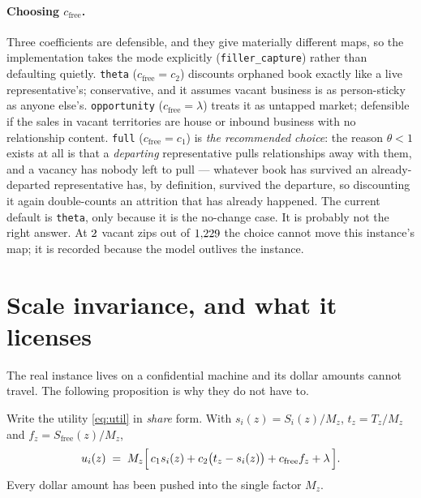 \documentclass[11pt]{article}
\theoremstyle{definition}
\newcommand{\Sfree}{S_{\mathrm{free}}}
\newcommand{\cfree}{c_{\mathrm{free}}}
\begin{document}
\paragraph{Choosing $\cfree$.}
Three coefficients are defensible, and they give materially different maps, so the
implementation takes the mode explicitly (\texttt{filler\_capture}) rather than defaulting
quietly. \texttt{theta} ($\cfree=c_2$) discounts orphaned book exactly like a live
representative's; conservative, and it assumes vacant business is as person-sticky as
anyone else's. \texttt{opportunity} ($\cfree=\lambda$) treats it as untapped market;
defensible if the sales in vacant territories are house or inbound business with no
relationship content. \texttt{full} ($\cfree=c_1$) is \emph{the recommended choice}: the
reason $\theta<1$ exists at all is that a \emph{departing} representative pulls
relationships away with them, and a vacancy has nobody left to pull --- whatever book has
survived an already-departed representative has, by definition, survived the departure, so
discounting it again double-counts an attrition that has already happened. The current
default is \texttt{theta}, only because it is the no-change case. It is probably not the
right answer. At $2$ vacant zips out of $1{,}229$ the choice cannot move this
instance's map; it is recorded because the model outlives the instance.

\section{Scale invariance, and what it licenses}\label{sec:scale}

The real instance lives on a confidential machine and its dollar amounts cannot travel.
The following proposition is why they do not have to.

Write the utility \eqref{eq:util} in \emph{share} form. With
$s_i(z)=S_i(z)/M_z$, $t_z=T_z/M_z$ and $f_z=\Sfree(z)/M_z$,
\begin{equation}\label{eq:shares}
u_i(z) \;=\; M_z\Bigl[\,c_1 s_i(z) + c_2\bigl(t_z - s_i(z)\bigr) + \cfree f_z + \lambda\,\Bigr].
\end{equation}
Every dollar amount has been pushed into the single factor $M_z$.
\end{document}
